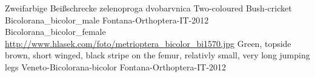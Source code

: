 {Zweifarbige Beißschrecke} %
{zelenoproga dvobarvnica} %
{Two-coloured Bush-cricket} %
{Bicolorana_bicolor_male} %
{Fontana-Orthoptera-IT-2012}%
{Bicolorana_bicolor_female} %
{\url{http://www.hlasek.com/foto/metrioptera_bicolor_bi1570.jpg}} %
{Green, topside brown, short winged, black stripe on the femur, relativly small, very long jumping legs} %
{} %
{Veneto-Bicolorana-bicolor} %
{Fontana-Orthoptera-IT-2012}%
